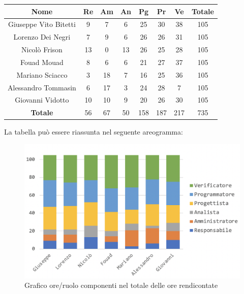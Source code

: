 				\begin{longtable}{|c|c|c|c|c|c|c|c}
					\hline
					\rowcolor{lighter-grayer}
					\textbf{Nome} & \textbf{Re} & \textbf{Am} & \textbf{An} & \textbf{Pg}  & \textbf{Pr}   & \textbf{Ve} & \textbf{Totale} \\
					\hline
					\endfirsthead
					
					\hline
					Giuseppe Vito Bitetti 		& 9 & 7 & 6 & 25 & 30 & 38 & 105\\
					\hline
					\hline
					Lorenzo Dei Negri			& 7 & 9 & 6 & 26 & 26 & 31 & 105\\
					\hline
					\hline
					Nicolò Frison				    & 13 & 0 & 13 &26 & 25 & 28 & 105\\
					\hline
					\hline
					Fouad Mouad 				 & 8 & 6 & 6 & 21 & 27 & 37 & 105\\
					\hline
					\hline
					Mariano Sciacco 			& 3 & 18 & 7 & 16 & 25 & 36 & 105\\
					\hline
					\hline
					Alessandro Tommasin    & 6 & 17 & 3 & 24 & 28 & 7 & 105\\
					\hline
					\hline
					Giovanni Vidotto 			 & 10 & 10 & 9 & 20 & 26 & 30 & 105\\
					\hline 
					\textbf{Totale}				 & 56 &  67 & 50 & 158 & 187 & 217 & 735\\
					\hline
				\end{longtable}
				\pagebreak
				
				La tabella può essere riassunta nel seguente areogramma:
				\begin{figure}[H]
					\centering
					\includegraphics[width=0.8\linewidth]{./images/totOreRed1.png}
					\caption{Grafico ore/ruolo componenti nel totale delle ore rendicontate}
					\label{fig:grafico suddivione ruoli totale ore rendicontete}
				\end{figure}
			

